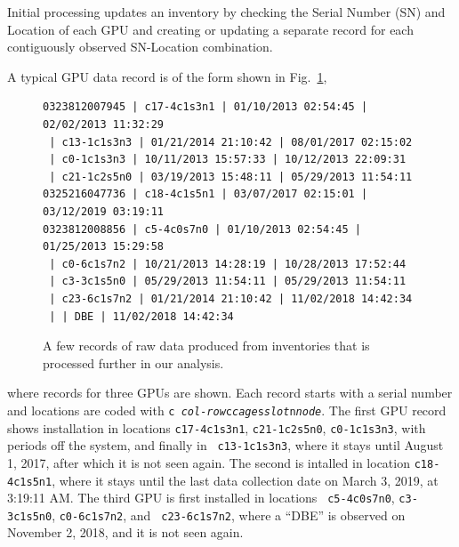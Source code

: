 Initial processing updates an inventory by checking the Serial Number
(SN) and Location of each GPU and creating or updating a separate
record for each contiguously observed SN-Location combination.


A typical GPU data record is of the form shown in Fig.~\ref{fig:dataraw},
\begin{figure}[tb]
{\tiny
\begin{verbatim}
0323812007945 | c17-4c1s3n1 | 01/10/2013 02:54:45 | 02/02/2013 11:32:29
 | c13-1c1s3n3 | 01/21/2014 21:10:42 | 08/01/2017 02:15:02
 | c0-1c1s3n3 | 10/11/2013 15:57:33 | 10/12/2013 22:09:31
 | c21-1c2s5n0 | 03/19/2013 15:48:11 | 05/29/2013 11:54:11
0325216047736 | c18-4c1s5n1 | 03/07/2017 02:15:01 | 03/12/2019 03:19:11
0323812008856 | c5-4c0s7n0 | 01/10/2013 02:54:45 | 01/25/2013 15:29:58
 | c0-6c1s7n2 | 10/21/2013 14:28:19 | 10/28/2013 17:52:44
 | c3-3c1s5n0 | 05/29/2013 11:54:11 | 05/29/2013 11:54:11
 | c23-6c1s7n2 | 01/21/2014 21:10:42 | 11/02/2018 14:42:34
 | | DBE | 11/02/2018 14:42:34
\end{verbatim}
}
\caption{A few records of raw data produced from inventories that is
  processed further in our analysis.}
\label{fig:dataraw}
\end{figure}
\noindent where records for three GPUs are shown. Each record starts
with a serial number and locations are coded with {\tt c{\it
    col-row}c{\it cage}s{\it slot}n{\it node}}. The first GPU record
shows installation in locations {\tt c17-4c1s3n1}, {\tt c21-1c2s5n0},
{\tt c0-1c1s3n3}, with periods off the system, and finally in {\tt
  c13-1c1s3n3}, where it stays until August 1, 2017, after which it is
not seen again. The second is intalled in location {\tt c18-4c1s5n1},
where it stays until the last data collection date on March 3, 2019,
at 3:19:11 AM. The third GPU is first installed in locations {\tt
  c5-4c0s7n0}, {\tt c3-3c1s5n0}, {\tt c0-6c1s7n2}, and {\tt
  c23-6c1s7n2}, where a ``DBE'' is observed on November 2, 2018, and
it is not seen again.

